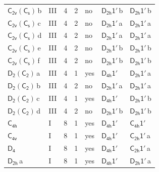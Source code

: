 \documentclass[10pt,a4paper]{article}
\numberwithin{equation}{section}
\newcommand{\grp}[1]{\mathsf{#1}}
\newcommand{\clsletter}[1]{\,{\scriptsize\color{black!55}#1}}
\begin{document}
{\begin{longtable}{@{}llrrlll@{}}
\href{C2v-C1v.pdf}{$\grp{C_{2v}}(\grp{C_{s}})$}\clsletter{b} & III & 4 & 2 & no & \href{D2h-1p.pdf}{$\grp{D_{2h}1'}$}\clsletter{b} & \href{D2h-1p.pdf}{$\grp{D_{2h}1'}$}\clsletter{b}\\
\href{C2v-C1v.pdf}{$\grp{C_{2v}}(\grp{C_{s}})$}\clsletter{c} & III & 4 & 2 & no & \href{D2h-1p.pdf}{$\grp{D_{2h}1'}$}\clsletter{a} & \href{D2h-1p.pdf}{$\grp{D_{2h}1'}$}\clsletter{a}\\
\href{C2v-C1v.pdf}{$\grp{C_{2v}}(\grp{C_{s}})$}\clsletter{d} & III & 4 & 2 & no & \href{D2h-1p.pdf}{$\grp{D_{2h}1'}$}\clsletter{a} & \href{D2h-1p.pdf}{$\grp{D_{2h}1'}$}\clsletter{a}\\
\href{C2v-C1v.pdf}{$\grp{C_{2v}}(\grp{C_{s}})$}\clsletter{e} & III & 4 & 2 & no & \href{D2h-1p.pdf}{$\grp{D_{2h}1'}$}\clsletter{b} & \href{D2h-1p.pdf}{$\grp{D_{2h}1'}$}\clsletter{b}\\
\href{C2v-C1v.pdf}{$\grp{C_{2v}}(\grp{C_{s}})$}\clsletter{f} & III & 4 & 2 & no & \href{D2h-1p.pdf}{$\grp{D_{2h}1'}$}\clsletter{b} & \href{D2h-1p.pdf}{$\grp{D_{2h}1'}$}\clsletter{b}\\
\href{D2-C2.pdf}{$\grp{D_{2}}(\grp{C_{2}})$}\clsletter{a} & III & 4 & 1 & yes & \href{D4h-1p.pdf}{$\grp{D_{4h}1'}$} & \href{D2h-1p.pdf}{$\grp{D_{2h}1'}$}\clsletter{a}\\
\href{D2-C2.pdf}{$\grp{D_{2}}(\grp{C_{2}})$}\clsletter{b} & III & 4 & 2 & no & \href{D2h-1p.pdf}{$\grp{D_{2h}1'}$}\clsletter{a} & \href{D2h-1p.pdf}{$\grp{D_{2h}1'}$}\clsletter{a}\\
\href{D2-C2.pdf}{$\grp{D_{2}}(\grp{C_{2}})$}\clsletter{c} & III & 4 & 1 & yes & \href{D4h-1p.pdf}{$\grp{D_{4h}1'}$} & \href{D2h-1p.pdf}{$\grp{D_{2h}1'}$}\clsletter{b}\\
\href{D2-C2.pdf}{$\grp{D_{2}}(\grp{C_{2}})$}\clsletter{d} & III & 4 & 2 & no & \href{D2h-1p.pdf}{$\grp{D_{2h}1'}$}\clsletter{b} & \href{D2h-1p.pdf}{$\grp{D_{2h}1'}$}\clsletter{b}\\
\href{../../../rotation/data/pdf/C4h.pdf}{$\grp{C_{4h}}$} & I & 8 & 1 & yes & \href{D4h-1p.pdf}{$\grp{D_{4h}1'}$} & \href{C4h-1p.pdf}{$\grp{C_{4h}1'}$}\\
\href{../../../rotation/data/pdf/C4v.pdf}{$\grp{C_{4v}}$} & I & 8 & 1 & yes & \href{D4h-1p.pdf}{$\grp{D_{4h}1'}$} & \href{C2h-1p.pdf}{$\grp{C_{2h}1'}$}\clsletter{a}\\
\href{../../../rotation/data/pdf/D4.pdf}{$\grp{D_{4}}$} & I & 8 & 1 & yes & \href{D4h-1p.pdf}{$\grp{D_{4h}1'}$} & \href{C2h-1p.pdf}{$\grp{C_{2h}1'}$}\clsletter{a}\\
\href{../../../rotation/data/pdf/D2h.pdf}{$\grp{D_{2h}}$}\clsletter{a} & I & 8 & 1 & yes & \href{D4h-1p.pdf}{$\grp{D_{4h}1'}$} & \href{D2h-1p.pdf}{$\grp{D_{2h}1'}$}\clsletter{a}\\

\end{longtable}}
\end{document}
